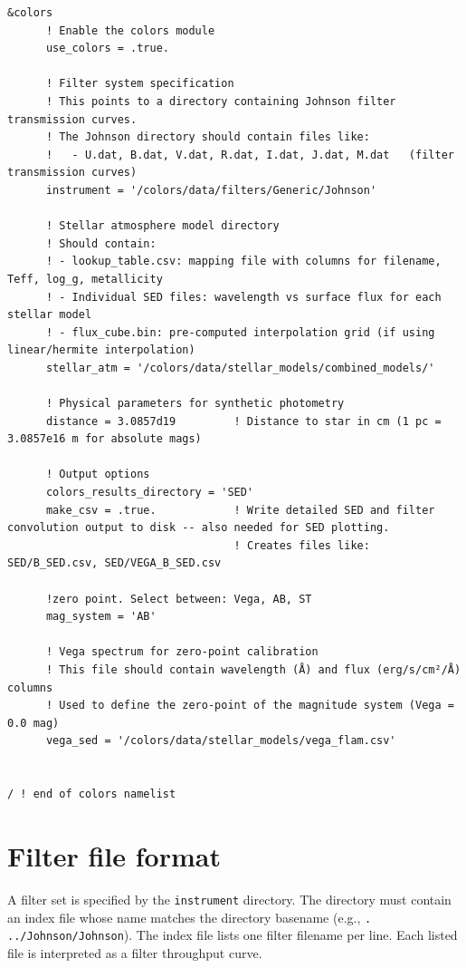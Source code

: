 \documentclass[linenumbers,apj,twocolumn, floatfix]{aastex701}
\begin{document}
\begin{verbatim}
&colors
      ! Enable the colors module
      use_colors = .true.
            
      ! Filter system specification
      ! This points to a directory containing Johnson filter transmission curves.
      ! The Johnson directory should contain files like:
      !   - U.dat, B.dat, V.dat, R.dat, I.dat, J.dat, M.dat   (filter transmission curves)
      instrument = '/colors/data/filters/Generic/Johnson'

      ! Stellar atmosphere model directory
      ! Should contain:
      ! - lookup_table.csv: mapping file with columns for filename, Teff, log_g, metallicity
      ! - Individual SED files: wavelength vs surface flux for each stellar model
      ! - flux_cube.bin: pre-computed interpolation grid (if using linear/hermite interpolation)
      stellar_atm = '/colors/data/stellar_models/combined_models/'

      ! Physical parameters for synthetic photometry
      distance = 3.0857d19         ! Distance to star in cm (1 pc = 3.0857e16 m for absolute mags)
      
      ! Output options
      colors_results_directory = 'SED'
      make_csv = .true.            ! Write detailed SED and filter convolution output to disk -- also needed for SED plotting.
                                   ! Creates files like: SED/B_SED.csv, SED/VEGA_B_SED.csv

      !zero point. Select between: Vega, AB, ST
      mag_system = 'AB'

      ! Vega spectrum for zero-point calibration
      ! This file should contain wavelength (Å) and flux (erg/s/cm²/Å) columns
      ! Used to define the zero-point of the magnitude system (Vega = 0.0 mag)
      vega_sed = '/colors/data/stellar_models/vega_flam.csv'


/ ! end of colors namelist
\end{verbatim} 

\section{Filter file format} 

A filter set is specified by the \texttt{instrument} directory.
The directory must contain an index file whose name matches the directory basename (e.g., \texttt{.
	../Johnson/Johnson}).
The index file lists one filter filename per line.
Each listed file is interpreted as a filter throughput curve.
\end{document}
